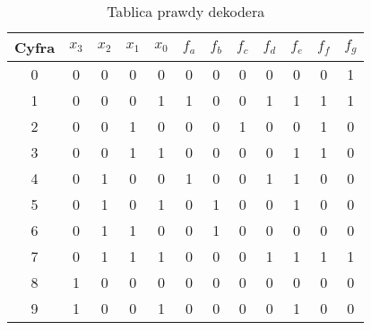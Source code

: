 \begin{table}[H]
    \centering
    \begin{tabular}{|c||c|c|c|c||c|c|c|c|c|c|c|}
        \hline
        Cyfra & $x_3$ & $x_2$ & $x_1$ & $x_0$ & $f_a$ & $f_b$ & $f_c$ & $f_d$ & $f_e$ & $f_f$ & $f_g$ \\ \hline
        \hline
        0     & 0     & 0     & 0     & 0     & 0     & 0     & 0     & 0     & 0     & 0     & 1     \\ \hline
        1     & 0     & 0     & 0     & 1     & 1     & 0     & 0     & 1     & 1     & 1     & 1     \\ \hline
        2     & 0     & 0     & 1     & 0     & 0     & 0     & 1     & 0     & 0     & 1     & 0     \\ \hline
        3     & 0     & 0     & 1     & 1     & 0     & 0     & 0     & 0     & 1     & 1     & 0     \\ \hline
        4     & 0     & 1     & 0     & 0     & 1     & 0     & 0     & 1     & 1     & 0     & 0     \\ \hline
        5     & 0     & 1     & 0     & 1     & 0     & 1     & 0     & 0     & 1     & 0     & 0     \\ \hline
        6     & 0     & 1     & 1     & 0     & 0     & 1     & 0     & 0     & 0     & 0     & 0     \\ \hline
        7     & 0     & 1     & 1     & 1     & 0     & 0     & 0     & 1     & 1     & 1     & 1     \\ \hline
        8     & 1     & 0     & 0     & 0     & 0     & 0     & 0     & 0     & 0     & 0     & 0     \\ \hline
        9     & 1     & 0     & 0     & 1     & 0     & 0     & 0     & 0     & 1     & 0     & 0     \\ \hline
    \end{tabular}
    \caption{Tablica prawdy dekodera}
    \label{tab:truth-table}
\end{table}